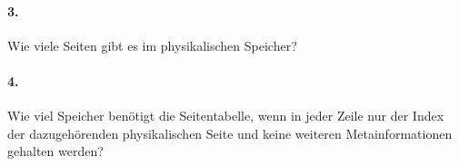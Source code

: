 \documentclass[paper=a4, fontsize=11pt]{scrartcl}
\numberwithin{equation}{section}
\numberwithin{figure}{section}
\numberwithin{table}{section}
\begin{document}
\paragraph{3.}
Wie viele Seiten gibt es im physikalischen Speicher?

\paragraph{4.}
Wie viel Speicher benötigt die Seitentabelle, wenn in jeder Zeile nur der Index der dazugehörenden physikalischen Seite und keine weiteren Metainformationen gehalten werden?

\end{document}
